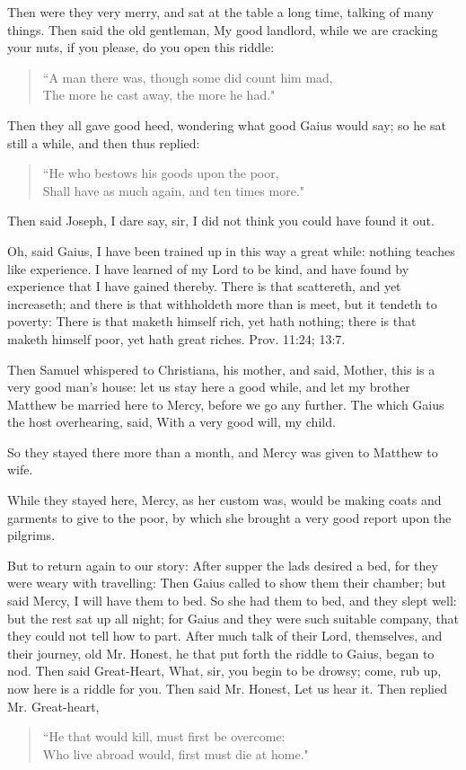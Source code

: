 Then were they very merry, and sat at the table a long time, talking of many things. Then said the old gentleman, My good landlord, while we are cracking your nuts, if you please, do you open this riddle:
\begin{verse}
``A man there was, though some did count him mad,\\
The more he cast away, the more he had."\\
\end{verse}

Then they all gave good heed, wondering what good Gaius would say; so he sat still a while, and then thus replied:
\begin{verse}
``He who bestows his goods upon the poor,\\
Shall have as much again, and ten times more."\\
\end{verse}

Then said Joseph, I dare say, sir, I did not think you could have found it out.

Oh, said Gaius, I have been trained up in this way a great while: nothing teaches like experience. I have learned of my Lord to be kind, and have found by experience that I have gained thereby. There is that scattereth, and yet increaseth; and there is that withholdeth more than is meet, but it tendeth to poverty: There is that maketh himself rich, yet hath nothing; there is that maketh himself poor, yet hath great riches. Prov. 11:24; 13:7.

Then Samuel whispered to Christiana, his mother, and said, Mother, this is a very good man's house: let us stay here a good while, and let my brother Matthew be married here to Mercy, before we go any further. The which Gaius the host overhearing, said, With a very good will, my child.

So they stayed there more than a month, and Mercy was given to Matthew to wife.

While they stayed here, Mercy, as her custom was, would be making coats and garments to give to the poor, by which she brought a very good report upon the pilgrims.

But to return again to our story: After supper the lads desired a bed, for they were weary with travelling: Then Gaius called to show them their chamber; but said Mercy, I will have them to bed. So she had them to bed, and they slept well: but the rest sat up all night; for Gaius and they were such suitable company, that they could not tell how to part. After much talk of their Lord, themselves, and their journey, old Mr. Honest, he that put forth the riddle to Gaius, began to nod. Then said Great-Heart, What, sir, you begin to be drowsy; come, rub up, now here is a riddle for you. Then said Mr. Honest, Let us hear it. Then replied Mr. Great-heart,
\begin{verse}
``He that would kill, must first be overcome:\\
Who live abroad would, first must die at home."\\
\end{verse}

